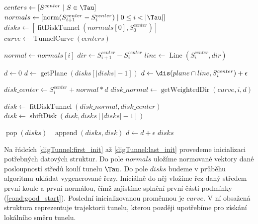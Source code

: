 \begin{algorithmic}[1]
\label{alg:digTunnel}

    \State $ centers \gets [ S^{center} \mid S \in \Tau ] $ \label{digTunnel:first_init}
    \State $ normals \gets [ \operatorname{norm}(S_{i + 1}^{center} - S_{i}^{center}) \mid 0 \leq i < |\Tau| ] $
    \State $ disks \gets   [ \operatorname{fitDiskTunnel}(normals[0], S_0^{center})] $
    \State $ curve \gets \operatorname{TunnelCurve}(centers) $ \label{digTunnel:last_init}
    \Statex

            \Break
        \EndIf
        \State $ normal \gets normals[i] $
        \State $ dir \gets S_{i + 1}^{center} - S_{i}^{center} $
        \State $ line \gets \operatorname{Line}(S_{i}^{center}, dir) $
        \Statex

        \State $ d \gets 0 $
         \label{digTunnel:while}
            \State $ d \gets \operatorname{getPlane}(disks[|disks|-1]) $
            \State $ d \gets \dis(plane \cap line, S_{i}^{center}) + \epsilon $
            \Statex

            \State $ disk\_center \gets S_{i}^{center} + normal * d $ \label{digTunnel:center}
            \State $ disk\_normal \gets \operatorname{getWeightedDir}(curve, i, d) $ \label{digTunnel:normal}

            \State $ disk \gets \operatorname{fitDiskTunnel}(disk\_normal, disk\_center) $ \label{alg:fit_disk}
            \State $ disk \gets \operatorname{shiftDisk}(disk, disks[|disks|-1]) $ \label{alg:shift_disk}
            \Statex

             \label{digTunnel:last_if}
                \State $ \operatorname{pop}(disks)  $ \label{digTunnel:last_if_end}
            \EndIf\
            \State $ \operatorname{append}(disks, disk) $
            \State $ d \gets d + \epsilon $ \label{digTunnel:incr_d}
        \EndWhile
    \EndFor
    \State \Return $ disks $
\EndFunction

\end{algorithmic}

Na řádcích \ref{digTunnel:first_init} až \ref{digTunnel:last_init} provedeme
inicializaci potřebných datových struktur. Do pole $ normals $ uložíme normované
vektory dané posloupností středů koulí tunelu $ \Tau $. Do pole $ disks $ budeme
v průběhu algoritmu ukládat vygenerované řezy. Iniciálně do něj vložíme
řez daný středem první koule a první normálou, čímž zajistíme splnění první
části podmínky (\ref{cond:good_start}). Poslední inicializovanou proměnnou je
$ curve $. V ní obsažená struktura reprezentuje trajektorii tunelu, kterou později
upotřebíme pro získání lokálního směru tunelu.

